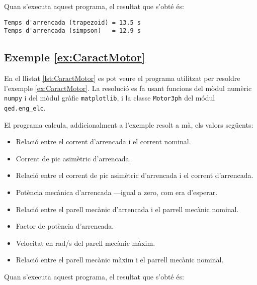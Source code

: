 Quan s'executa aquest programa, el resultat que s'obté és:
\lstset{
	language=,
	numbers=none,
	frame=none
}
\begin{lstlisting}
Temps d'arrencada (trapezoid) = 13.5 s
Temps d'arrencada (simpson)   = 12.9 s
\end{lstlisting} 


\hypertarget{exemple:CaractMotor}{\subsection{Exemple \ref*{ex:CaractMotor} \CaractMotor}}
En el llistat \vref{lst:CaractMotor} es pot veure el programa utilitzat per resoldre l'exemple \vref{ex:CaractMotor}. La resolució es fa usant funcions del mòdul numèric \texttt{numpy} i del mòdul gràfic \texttt{matplotlib}, i la classe \texttt{Motor3ph} del módul \texttt{qed.eng\_elc}. 


El programa calcula, addicionalment a l'exemple resolt a mà, els valors següents: 
\begin{itemize}
	\item Relació entre el corrent d'arrencada i el corrent nominal.
	\item Corrent de pic asimètric d'arrencada.
	\item Relació entre el corrent de pic asimètric d'arrencada i el corrent d'arrencada.
	\item   Potència mecànica d'arrencada ---igual a zero, com era d'esperar.
	\item Relació entre el parell mecànic d'arrencada i el parrell mecànic nominal.
	\item Factor de potència d'arrencada.
	\item Velocitat en rad/s del parell mecànic màxim.
	\item Relació entre el parell mecànic màxim i el parrell mecànic nominal.
\end{itemize}

Quan s'executa aquest programa, el resultat que s'obté és:
\lstset{
	language=,
	numbers=none,
	frame=none
}

